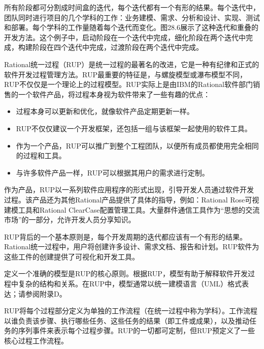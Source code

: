 所有阶段都可分割成时间盒的迭代，每个迭代都有一个有形的结果。每个迭代中，团队同时进行项目的几个学科的工作：业务建模、需求、分析和设计、实现、测试和部署。每个学科的工作量随着每个迭代而变化。图28.6展示了这种迭代和重叠的开发方法。这个例子中，启动阶段在一个迭代中完成，细化阶段在两个迭代中完成，构建阶段在四个迭代中完成，过渡阶段在两个迭代中完成。



Rational统一过程（RUP）是统一过程的最著名的改进，它是一种有纪律和正式的软件开发过程管理方法。RUP最重要的特征是，与螺旋模型或瀑布模型不同，RUP不仅仅是一个理论上的过程模型。RUP实际上是由IBM的Rational软件部门销售的一个软件产品，将过程本身视为软件带来了一些有趣的优点：

\begin{itemize}
\item
过程本身可以更新和优化，就像软件产品定期更新一样。

\item
RUP不仅仅建议一个开发框架，还包括一组与该框架一起使用的软件工具。

\item
作为一个产品，RUP可以推广到整个工程团队，以便所有成员都使用完全相同的过程和工具。

\item
与许多软件产品一样，RUP可以根据其用户的需求进行定制。
\end{itemize}


作为产品，RUP以一系列软件应用程序的形式出现，引导开发人员通过软件开发过程。该产品还为其他Rational产品提供了具体的指导，例如：Rational Rose可视建模工具和Rational ClearCase配置管理工具。大量群件通信工具作为“思想的交流市场”的一部分，允许开发人员分享知识。

RUP背后的一个基本原则是，每个开发周期的迭代都应该有一个有形的结果。Rational统一过程中，用户将创建许多设计、需求文档、报告和计划。RUP软件为这些工件的创建提供了可视化和开发工具。


定义一个准确的模型是RUP的核心原则。根据RUP，模型有助于解释软件开发过程中复杂的结构和关系。在RUP中，模型通常以统一建模语言（UML）格式表达；请参阅附录D。

RUP将每个过程部分定义为单独的工作流程（在统一过程中称为学科）。工作流程以谁负责该步骤、执行哪些任务、这些任务的结果（即工件或成果），以及推动任务的序列事件来表示每个过程步骤。RUP的一切都可定制，但RUP预定义了一些核心过程工作流程。


